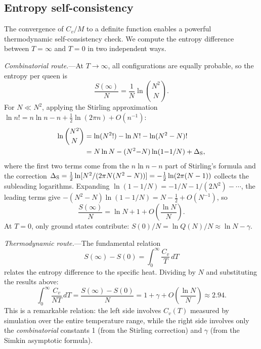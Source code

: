 \documentclass[aps, pre, reprint, amsmath, amssymb, superscriptaddress, floatfix]{revtex4-2}
\begin{document}
\subsection{Entropy self-consistency}
\label{sec:entropy_check}

The convergence of $C_v/M$ to a definite function enables a powerful
thermodynamic self-consistency check.  We compute the entropy
difference between $T = \infty$ and $T = 0$ in two independent ways.

\textit{Combinatorial route.}---At $T \to \infty$, all configurations
are equally probable, so the entropy per queen is
\begin{equation}
  \frac{S(\infty)}{N}
  = \frac{1}{N}\ln\binom{N^2}{N}.
  \label{eq:Sinf_def}
\end{equation}
For $N \ll N^2$, applying the Stirling approximation
$\ln n! = n\ln n - n + \tfrac{1}{2}\ln(2\pi n) + O(n^{-1})$:
\begin{align}
  \ln\binom{N^2}{N}
  &= \ln(N^2!) - \ln N! - \ln(N^2 - N)! \notag\\
  &= N\ln N - (N^2{-}N)\ln(1{-}1/N)
  + \Delta_{\rm S},
  \label{eq:Sinf_stirling}
\end{align}
where the first two terms come from the $n\ln n - n$ part of Stirling's
formula and the correction
$\Delta_{\rm S} = \tfrac{1}{2}\ln[N^2/(2\pi N(N^2-N))]
= -\tfrac{1}{2}\ln(2\pi(N-1))$ collects the subleading logarithms.
Expanding $\ln(1 - 1/N) = -1/N - 1/(2N^2) - \cdots$, the
leading terms give $-(N^2-N)\ln(1-1/N) = N - \tfrac{1}{2} + O(N^{-1})$,
so
\begin{equation}
  \frac{S(\infty)}{N}
  = \ln N + 1 + O\!\left(\frac{\ln N}{N}\right).
  \label{eq:Sinf}
\end{equation}
At $T = 0$, only ground states contribute:
$S(0)/N = \ln Q(N)/N \approx \ln N - \gamma$.

\textit{Thermodynamic route.}---The fundamental relation
\begin{equation}
  S(\infty) - S(0) = \int_0^\infty \frac{C_v}{T}\,dT
  \label{eq:thermo_int}
\end{equation}
relates the entropy difference to the specific heat.  Dividing by $N$
and substituting the results above:
\begin{equation}
  \int_0^\infty \frac{C_v}{NT}\,dT
  = \frac{S(\infty) - S(0)}{N}
  = 1 + \gamma + O\!\left(\frac{\ln N}{N}\right)
  \approx 2.94.
  \label{eq:DS}
\end{equation}
This is a remarkable relation: the left side involves $C_v(T)$ measured by simulation over the entire
temperature range, while the right side involves only the
\emph{combinatorial} constants 1 (from the Stirling correction) and
$\gamma$ (from the Simkin asymptotic formula).
\end{document}
